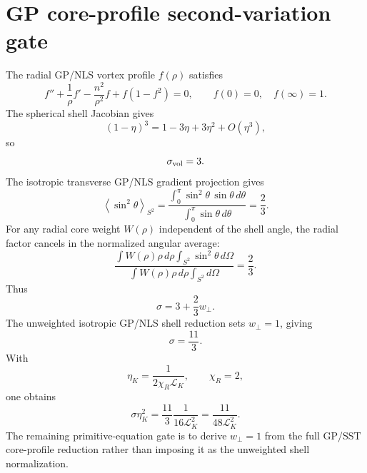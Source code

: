 \section{GP core-profile second-variation gate}
\label{app:gp-core-profile-second-variation}

The radial GP/NLS vortex profile \(f(\rho)\) satisfies
\[
  f''+\frac{1}{\rho}f'
  -
  \frac{n^2}{\rho^2}f
  +
  f(1-f^2)=0,
  \qquad
  f(0)=0,\quad f(\infty)=1.
\]
The spherical shell Jacobian gives
\[
  (1-\eta)^3=1-3\eta+3\eta^2+O(\eta^3),
\]
so
\[
  \sigma_{\rm vol}=3.
\]
The isotropic transverse GP/NLS gradient projection gives
\[
  \left\langle \sin^2\theta\right\rangle_{S^2}
  =
  \frac{\int_0^\pi \sin^2\theta\,\sin\theta\,d\theta}
       {\int_0^\pi \sin\theta\,d\theta}
  =
  \frac{2}{3}.
\]
For any radial core weight \(W(\rho)\) independent of the shell angle, the
radial factor cancels in the normalized angular average:
\[
  \frac{\int W(\rho)\rho\,d\rho\int_{S^2}\sin^2\theta\,d\Omega}
       {\int W(\rho)\rho\,d\rho\int_{S^2}d\Omega}
  =
  \frac23.
\]
Thus
\[
  \sigma=3+\frac23 w_\perp.
\]
The unweighted isotropic GP/NLS shell reduction sets \(w_\perp=1\), giving
\[
  \sigma=\frac{11}{3}.
\]
With
\[
  \eta_K=\frac{1}{2\chi_R\mathcal L_K},
  \qquad
  \chi_R=2,
\]
one obtains
\[
  \sigma\eta_K^2
  =
  \frac{11}{3}\frac{1}{16\mathcal L_K^2}
  =
  \frac{11}{48\mathcal L_K^2}.
\]
The remaining primitive-equation gate is to derive \(w_\perp=1\) from the full
GP/SST core-profile reduction rather than imposing it as the unweighted shell
normalization.
